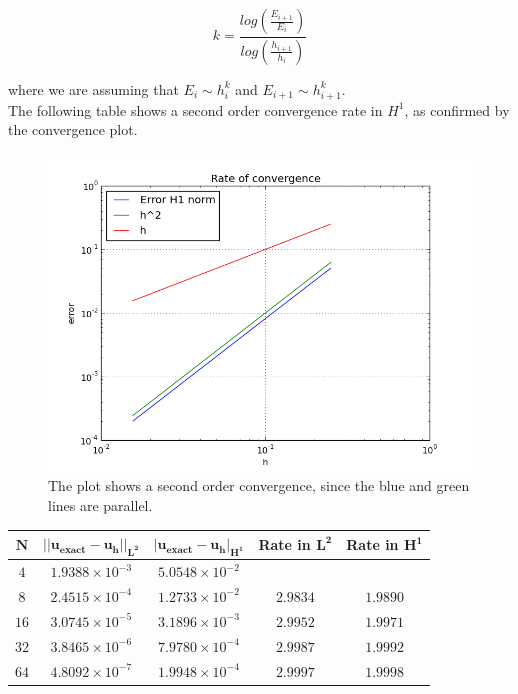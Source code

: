\documentclass[11pt,a4paper,titlepage]{report}
\begin{document}
\[
k = \frac{log(\frac{E_{i+1}}{E_i})}{log(\frac{h_{i+1}}{h_i})}
\]

where we are assuming that $E_i \sim h^k_i$ and $E_{i+1} \sim h^k_{i+1}$. \\
The following table shows a second order convergence rate in $H^1$, as confirmed by the convergence plot.

\vspace{1cm}
\begin{figure}[h!]
\centering
\includegraphics[width=\textwidth]{images/convergence_sine}
\caption{The plot shows a second order convergence, since the blue and green lines are parallel.}
\end{figure}
\vspace{1cm}

\begin{center}
\begin{tabular}{| c | c | c | c | c |}
\hline
$  \mathbf{N}$ & $ \mathbf{|| u_{exact} - u_h ||_{L^2}}$ & $  \mathbf{ | u_{exact} - u_h |_{H^1}}$ & \textbf{Rate in }  $ \mathbf{L^2}$ & \textbf{Rate in } $  \mathbf{H^1}$  \\
\hline
$ 4 $ & $1.9388 \times 10^{-3}$ & $5.0548 \times 10^{-2}$  & & \\
\hline
$ 8$ & $2.4515  \times 10^{-4}$ & $1.2733 \times 10^{-2}$ &  $2.9834$ &  $1.9890$   \\
\hline
$ 16 $ & $ 3.0745 \times 10^{-5}$ & $3.1896 \times 10^{-3}$ & $ 2.9952 $ & $1.9971$   \\
\hline
$ 32$ & $3.8465 \times 10^{-6}$ & $7.9780 \times 10^{-4}$ & $ 2.9987 $ & $ 1.9992 $  \\
\hline
$ 64$ & $4.8092 \times 10^{-7}$ & $1.9948 \times 10^{-4}$  & $ 2.9997 $ & $1.9998$ \\
\hline
\end{tabular}
\end{center}
\end{document}
